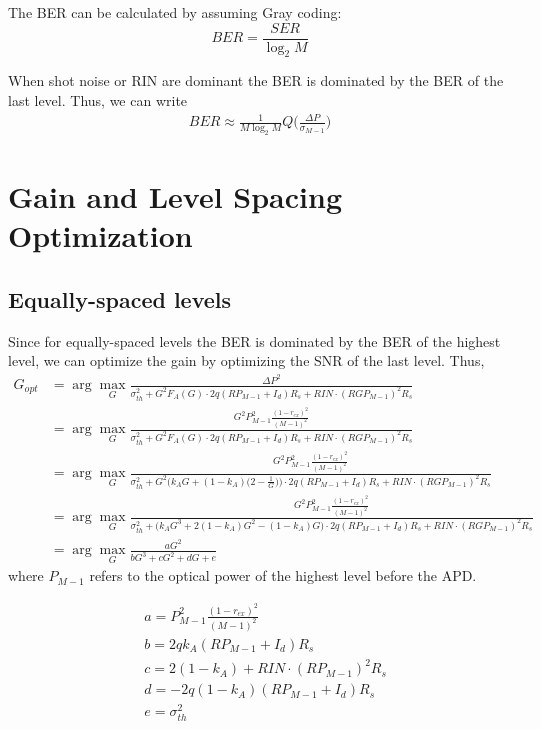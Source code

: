 \documentclass[a4paper]{article}
\begin{document}
The BER can be calculated by assuming Gray coding:
\begin{equation}
BER = \frac{SER}{\log_2 M}
\end{equation}

When shot noise or RIN are dominant the BER is dominated by the BER of the last level. Thus, we can write
\begin{align}
BER \approx \frac{1}{M\log_2 M}Q\bigg(\frac{\Delta P}{\sigma_{M-1}}\bigg)
\end{align}

\section{Gain and Level Spacing Optimization}

\subsection{Equally-spaced levels}
Since for equally-spaced levels the BER is dominated by the BER of the highest level, we can optimize the gain by optimizing the SNR of the last level. Thus,
\begin{align} \nonumber
G_{opt} &= \arg\max_{G} \frac{\Delta P^2}{\sigma_{th}^2 + G^2F_A(G)\cdot 2q(RP_{M-1} + I_d)R_s + RIN\cdot (RGP_{M-1})^2R_s} \\ \nonumber
& = \arg\max_{G}\frac{G^2P^2_{M-1}\frac{(1-r_{ex})^2}{(M-1)^2}}{\sigma_{th}^2 + G^2F_A(G)\cdot 2q(RP_{M-1} + I_d)R_s + RIN\cdot (RGP_{M-1})^2R_s} \\ \nonumber
& = \arg\max_{G}\frac{G^2P^2_{M-1}\frac{(1-r_{ex})^2}{(M-1)^2}}{\sigma_{th}^2 + G^2\Big(k_AG + (1-k_A)\Big(2 - \frac{1}{G}\Big)\Big)\cdot 2q(RP_{M-1} + I_d)R_s + RIN\cdot (RGP_{M-1})^2R_s} \\ \nonumber
& = \arg\max_{G}\frac{G^2P^2_{M-1}\frac{(1-r_{ex})^2}{(M-1)^2}}{\sigma_{th}^2 + \Big(k_AG^3 + 2(1-k_A)G^2 - (1-k_A)G\Big)\cdot 2q(RP_{M-1} + I_d)R_s + RIN\cdot (RGP_{M-1})^2R_s} \\
& = \arg\max_{G}\frac{aG^2}{bG^3 + cG^2 + dG + e}
\end{align}
where $P_{M-1}$ refers to the optical power of the highest level before the APD.

\begin{align}
& a = P^2_{M-1}\frac{(1-r_{ex})^2}{(M-1)^2} \\
& b = 2qk_A(RP_{M-1} + I_d)R_s \\
& c = 2(1-k_A) + RIN\cdot (RP_{M-1})^2R_s \\
& d = -2q(1-k_A)(RP_{M-1} + I_d)R_s \\
& e = \sigma_{th}^2 
\end{align}
\end{document}
